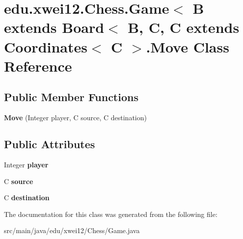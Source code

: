 \hypertarget{classedu_1_1xwei12_1_1_chess_1_1_game_1_1_move}{}\section{edu.\+xwei12.\+Chess.\+Game$<$ B extends Board$<$ B, C, C extends Coordinates$<$ C $>$.Move Class Reference}
\label{classedu_1_1xwei12_1_1_chess_1_1_game_1_1_move}
\subsection*{Public Member Functions}
\begin{DoxyCompactItemize}
\item 
{\bfseries Move} (Integer player, C source, C destination)\hypertarget{classedu_1_1xwei12_1_1_chess_1_1_game_1_1_move_a196c565841880b10c1b662a2a31ad53a}{}\label{classedu_1_1xwei12_1_1_chess_1_1_game_1_1_move_a196c565841880b10c1b662a2a31ad53a}

\end{DoxyCompactItemize}
\subsection*{Public Attributes}
\begin{DoxyCompactItemize}
\item 
Integer {\bfseries player}\hypertarget{classedu_1_1xwei12_1_1_chess_1_1_game_1_1_move_aea28ccadd68d62243f41aa3b8f6e8c14}{}\label{classedu_1_1xwei12_1_1_chess_1_1_game_1_1_move_aea28ccadd68d62243f41aa3b8f6e8c14}

\item 
C {\bfseries source}\hypertarget{classedu_1_1xwei12_1_1_chess_1_1_game_1_1_move_ae9b31ffa26cfd054fe646afe122a892f}{}\label{classedu_1_1xwei12_1_1_chess_1_1_game_1_1_move_ae9b31ffa26cfd054fe646afe122a892f}

\item 
C {\bfseries destination}\hypertarget{classedu_1_1xwei12_1_1_chess_1_1_game_1_1_move_aeac9ec249e4210c793efa1ccd3745e6d}{}\label{classedu_1_1xwei12_1_1_chess_1_1_game_1_1_move_aeac9ec249e4210c793efa1ccd3745e6d}

\end{DoxyCompactItemize}


The documentation for this class was generated from the following file\+:\begin{DoxyCompactItemize}
\item 
src/main/java/edu/xwei12/\+Chess/Game.\+java\end{DoxyCompactItemize}
